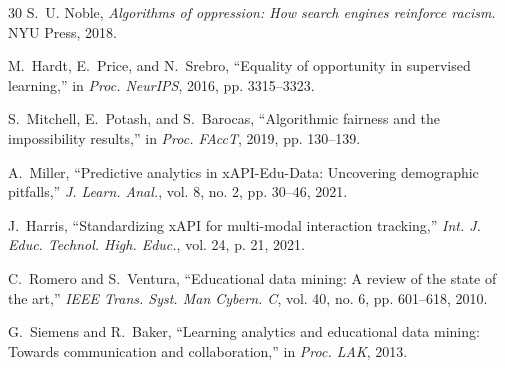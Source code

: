 \documentclass[conference]{IEEEtran}
\begin{document}
\begin{thebibliography}{30}
S.~U. Noble, \textit{Algorithms of oppression: How search engines reinforce racism}. NYU Press, 2018.

M.~Hardt, E.~Price, and N.~Srebro, ``Equality of opportunity in supervised learning,'' in \textit{Proc. NeurIPS}, 2016, pp. 3315--3323.

S.~Mitchell, E.~Potash, and S.~Barocas, ``Algorithmic fairness and the impossibility results,'' in \textit{Proc. FAccT}, 2019, pp. 130--139.

A.~Miller, ``Predictive analytics in xAPI-Edu-Data: Uncovering demographic pitfalls,'' \textit{J. Learn. Anal.}, vol. 8, no. 2, pp. 30--46, 2021.

J.~Harris, ``Standardizing xAPI for multi-modal interaction tracking,'' \textit{Int. J. Educ. Technol. High. Educ.}, vol. 24, p. 21, 2021.

C.~Romero and S.~Ventura, ``Educational data mining: A review of the state of the art,'' \textit{IEEE Trans. Syst. Man Cybern. C}, vol. 40, no. 6, pp. 601--618, 2010.

G.~Siemens and R.~Baker, ``Learning analytics and educational data mining: Towards communication and collaboration,'' in \textit{Proc. LAK}, 2013.

\end{thebibliography}
\end{document}
